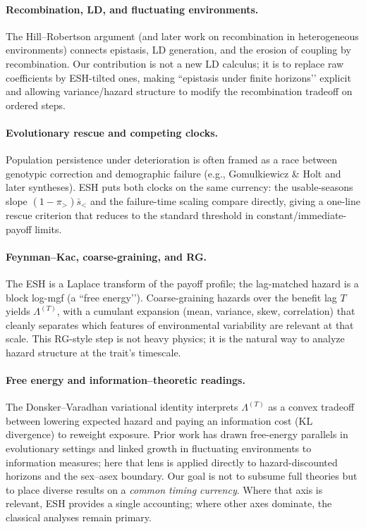 \documentclass[11pt]{article}
\theoremstyle{upright}
\newcommand{\hazT}[1]{\Lambda^{(#1)}}          %
\begin{document}
\paragraph{Recombination, LD, and fluctuating environments.}
The Hill–Robertson argument\citep{HillRobertson1966} (and later work on recombination in heterogeneous environments) connects epistasis, LD generation, and the erosion of coupling by recombination. Our contribution is not a new LD calculus; it is to replace raw coefficients by ESH-tilted ones, making “epistasis under finite horizons’’ explicit and allowing variance/hazard structure to modify the recombination tradeoff on ordered steps.

\paragraph{Evolutionary rescue and competing clocks.}
Population persistence under deterioration is often framed as a race between genotypic correction and demographic failure (e.g., Gomulkiewicz \& Holt and later syntheses). ESH puts both clocks on the same currency: the usable-seasons slope $(1-\pi_>)\bar s_{<}$ and the failure-time scaling compare directly, giving a one-line rescue criterion that reduces to the standard threshold in constant/immediate-payoff limits.

\paragraph{Feynman--Kac, coarse-graining, and RG.}
The ESH is a Laplace transform of the payoff profile; the lag-matched hazard is a block log-mgf (a “free energy’’). Coarse-graining hazards over the benefit lag $T$ yields $\hazT{T}$, with a cumulant expansion (mean, variance, skew, correlation) that cleanly separates which features of environmental variability are relevant at that scale. This RG-style step is not heavy physics; it is the natural way to analyze hazard structure at the trait’s timescale.

\paragraph{Free energy and information--theoretic readings.}
The Donsker--Varadhan variational identity interprets $\hazT{T}$ as a convex tradeoff between lowering expected hazard and paying an information cost (KL divergence) to reweight exposure. Prior work has drawn free-energy parallels in evolutionary settings and linked growth in fluctuating environments to information measures; here that lens is applied directly to hazard-discounted horizons and the sex–asex boundary. Our goal is not to subsume full theories but to place diverse results on a \emph{common timing currency}. Where that axis is relevant, ESH provides a single accounting; where other axes dominate, the classical analyses remain primary.
\end{document}
